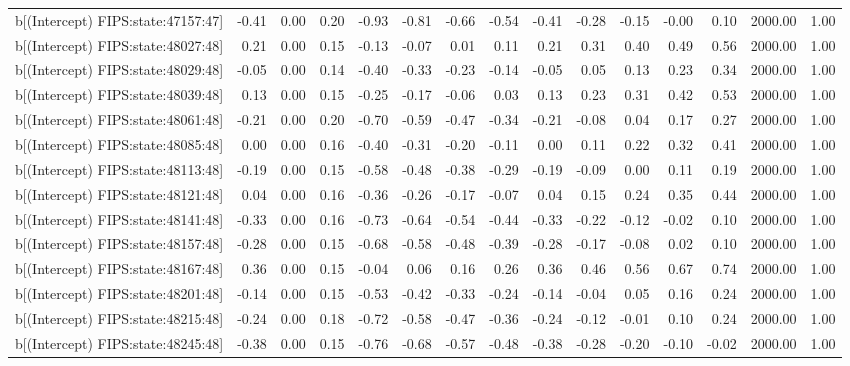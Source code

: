 \begin{table}[ht]
\begin{tabular}{rrrrrrrrrrrrrrr}
  b[(Intercept) FIPS:state:47157:47] & -0.41 & 0.00 & 0.20 & -0.93 & -0.81 & -0.66 & -0.54 & -0.41 & -0.28 & -0.15 & -0.00 & 0.10 & 2000.00 & 1.00 \\ 
  b[(Intercept) FIPS:state:48027:48] & 0.21 & 0.00 & 0.15 & -0.13 & -0.07 & 0.01 & 0.11 & 0.21 & 0.31 & 0.40 & 0.49 & 0.56 & 2000.00 & 1.00 \\ 
  b[(Intercept) FIPS:state:48029:48] & -0.05 & 0.00 & 0.14 & -0.40 & -0.33 & -0.23 & -0.14 & -0.05 & 0.05 & 0.13 & 0.23 & 0.34 & 2000.00 & 1.00 \\ 
  b[(Intercept) FIPS:state:48039:48] & 0.13 & 0.00 & 0.15 & -0.25 & -0.17 & -0.06 & 0.03 & 0.13 & 0.23 & 0.31 & 0.42 & 0.53 & 2000.00 & 1.00 \\ 
  b[(Intercept) FIPS:state:48061:48] & -0.21 & 0.00 & 0.20 & -0.70 & -0.59 & -0.47 & -0.34 & -0.21 & -0.08 & 0.04 & 0.17 & 0.27 & 2000.00 & 1.00 \\ 
  b[(Intercept) FIPS:state:48085:48] & 0.00 & 0.00 & 0.16 & -0.40 & -0.31 & -0.20 & -0.11 & 0.00 & 0.11 & 0.22 & 0.32 & 0.41 & 2000.00 & 1.00 \\ 
  b[(Intercept) FIPS:state:48113:48] & -0.19 & 0.00 & 0.15 & -0.58 & -0.48 & -0.38 & -0.29 & -0.19 & -0.09 & 0.00 & 0.11 & 0.19 & 2000.00 & 1.00 \\ 
  b[(Intercept) FIPS:state:48121:48] & 0.04 & 0.00 & 0.16 & -0.36 & -0.26 & -0.17 & -0.07 & 0.04 & 0.15 & 0.24 & 0.35 & 0.44 & 2000.00 & 1.00 \\ 
  b[(Intercept) FIPS:state:48141:48] & -0.33 & 0.00 & 0.16 & -0.73 & -0.64 & -0.54 & -0.44 & -0.33 & -0.22 & -0.12 & -0.02 & 0.10 & 2000.00 & 1.00 \\ 
  b[(Intercept) FIPS:state:48157:48] & -0.28 & 0.00 & 0.15 & -0.68 & -0.58 & -0.48 & -0.39 & -0.28 & -0.17 & -0.08 & 0.02 & 0.10 & 2000.00 & 1.00 \\ 
  b[(Intercept) FIPS:state:48167:48] & 0.36 & 0.00 & 0.15 & -0.04 & 0.06 & 0.16 & 0.26 & 0.36 & 0.46 & 0.56 & 0.67 & 0.74 & 2000.00 & 1.00 \\ 
  b[(Intercept) FIPS:state:48201:48] & -0.14 & 0.00 & 0.15 & -0.53 & -0.42 & -0.33 & -0.24 & -0.14 & -0.04 & 0.05 & 0.16 & 0.24 & 2000.00 & 1.00 \\ 
  b[(Intercept) FIPS:state:48215:48] & -0.24 & 0.00 & 0.18 & -0.72 & -0.58 & -0.47 & -0.36 & -0.24 & -0.12 & -0.01 & 0.10 & 0.24 & 2000.00 & 1.00 \\ 
  b[(Intercept) FIPS:state:48245:48] & -0.38 & 0.00 & 0.15 & -0.76 & -0.68 & -0.57 & -0.48 & -0.38 & -0.28 & -0.20 & -0.10 & -0.02 & 2000.00 & 1.00 \\ 

\end{tabular}
\end{table}

